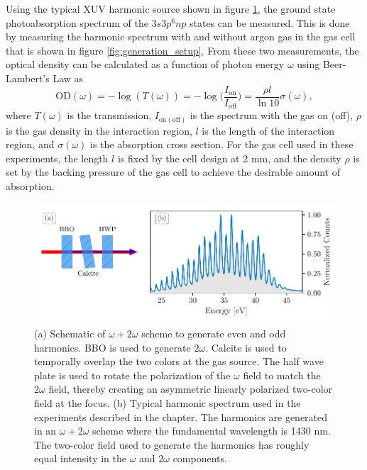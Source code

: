 Using the typical XUV harmonic source shown in figure \ref{fig:harmonic_spectrum}, the ground state photoabsorption spectrum of the $3s3p^6np$ states can be measured.  This is done by measuring the harmonic spectrum with and without argon gas in the gas cell that is shown in figure \ref{fig:generation_setup}.  From these two measurements, the optical density can be calculated as a function of photon energy $\omega$ using Beer-Lambert's Law as
\begin{equation}
\label{eqn:OD}
	\mathrm{OD}(\omega)=-\log(T(\omega))=-\log\bigg(\frac{I_{\mathrm{on}}}{I_{\mathrm{off}}}\bigg) = \frac{\rho l}{\ln 10}\sigma(\omega),
\end{equation}
where $T(\omega)$ is the transmission, $I_{\mathrm{on (off)}}$ is the spectrum with the gas on (off), $\rho$ is the gas density in the interaction region, $l$ is the length of the interaction region, and $\sigma(\omega)$ is the absorption cross section.  For the gas cell used in these experiments, the length $l$ is fixed by the cell design at 2 mm, and the density $\rho$ is set by the backing pressure of the gas cell to achieve the desirable amount of absorption. 

\begin{figure}
	\centering
	\includegraphics[width=1.0\textwidth]{figures/ATS/harmonic_spectrum_2.pdf}
	\caption[Typical harmonic spectrum used in ATS experiments]{(a) Schematic of $\omega + 2\omega$ scheme to generate even and odd harmonics.  BBO is used to generate $2\omega$. Calcite is used to temporally overlap the two colors at the gas source.  The half wave plate is used to rotate the polarization of the $\omega$ field to match the $2\omega$ field, thereby creating an asymmetric linearly polarized two-color field at the focus. (b) Typical harmonic spectrum used in the experiments described in the chapter.  The harmonics are generated in an $\omega + 2\omega$ scheme where the fundamental wavelength is 1430 nm.  The two-color field used to generate the harmonics has roughly equal intensity in the $\omega$ and $2\omega$ components.}
	\label{fig:harmonic_spectrum}
\end{figure}


